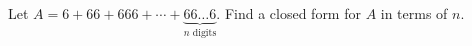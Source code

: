 Let $A=6+66+666+\cdots+\underbrace{66\ldots6}_{n\text{ digits}}$. Find a closed form for $A$ in terms of $n$.
